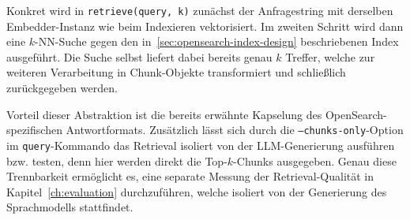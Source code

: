 Konkret wird in \texttt{retrieve(query, k)} zunächst der Anfragestring mit derselben Embedder-Instanz wie beim Indexieren vektorisiert. Im
zweiten Schritt wird dann eine $k$-NN-Suche gegen den in~\ref{sec:opensearch-index-design} beschriebenen Index ausgeführt. Die Suche selbst liefert
dabei bereits genau $k$ Treffer, welche zur weiteren Verarbeitung in Chunk-Objekte transformiert und schließlich zurückgegeben werden.

Vorteil dieser Abstraktion ist die bereits erwähnte Kapselung des OpenSearch-spezifischen Antwortformats. Zusätzlich lässt sich durch die
\texttt{--chunks-only}-Option im \texttt{query}-Kommando das Retrieval isoliert von der LLM-Generierung ausführen bzw. testen, denn hier werden
direkt die Top-$k$-Chunks ausgegeben. Genau diese Trennbarkeit ermöglicht es, eine separate Messung der Retrieval-Qualität in Kapitel~\ref{ch:evaluation}
durchzuführen, welche isoliert von der Generierung des Sprachmodells stattfindet.